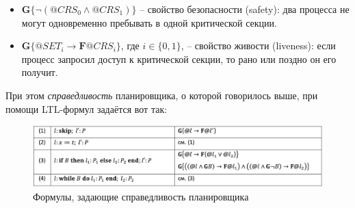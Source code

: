 \begin{itemize}
	\item $\textbf{G}\{\neg (@CRS_0 \wedge @CRS_1)\}$ -- свойство $\textit{безопасности}$ (safety): два процесса не могут одновременно пребывать в одной критической секции.
	\item $\textbf{G}\{@SET_i \rightarrow \textbf{F} @ CRS_i\}$, где $i \in \{0, 1\}$, -- свойство $\textit{живости}$ (liveness): если процесс запросил доступ к критической секции, то рано или поздно он его получит.
\end{itemize}

При этом \textit{справедливость} планировщика, о которой говорилось выше, при помощи LTL-формул задаётся вот так:

\begin{figure}[H]
  \includegraphics[width=\linewidth]{pics/ltl-scheduler.png}
  \caption{Формулы, задающие справедливость планировщика}
  \label{LTL-scheduler}
\end{figure}